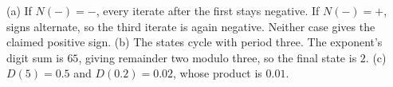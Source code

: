 (a) If $N(-)=-$, every iterate after the first stays negative. If $N(-)=+$, signs alternate, so the third iterate is again negative. Neither case gives the claimed positive sign.
(b) The states cycle with period three. The exponent's digit sum is $65$, giving remainder two modulo three, so the final state is $\boxed2$.
(c) $D(5)=0.5$ and $D(0.2)=0.02$, whose product is $\boxed{0.01}$.
